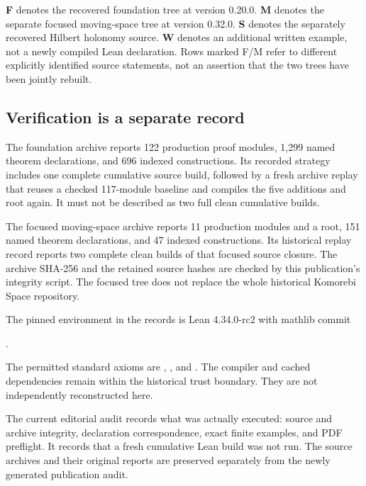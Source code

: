 \textbf{F} denotes the recovered foundation tree at version 0.20.0. \textbf{M} denotes the separate focused moving-space tree at version 0.32.0. \textbf{S} denotes the separately recovered Hilbert holonomy source. \textbf{W} denotes an additional written example, not a newly compiled Lean declaration. Rows marked F/M refer to different explicitly identified source statements, not an assertion that the two trees have been jointly rebuilt.



\par\noindent\begin{minipage}{\linewidth}\subsection{Verification is a separate record}
The foundation archive reports 122 production proof modules, 1,299 named theorem declarations, and 696 indexed constructions. Its recorded strategy includes one complete cumulative source build, followed by a fresh archive replay that reuses a checked 117-module baseline and compiles the five additions and root again. It must not be described as two full clean cumulative builds.

The focused moving-space archive reports 11 production modules and a root, 151 named theorem declarations, and 47 indexed constructions. Its historical replay record reports two complete clean builds of that focused source closure. The archive SHA-256 and the retained source hashes are checked by this publication's integrity script. The focused tree does not replace the whole historical Komorebi Space repository.

The pinned environment in the records is Lean 4.34.0-rc2 with mathlib commit\par\smallskip\noindent{}.\par\smallskip The permitted standard axioms are , , and . The compiler and cached dependencies remain within the historical trust boundary. They are not independently reconstructed here.

The current editorial audit records what was actually executed: source and archive integrity, declaration correspondence, exact finite examples, and PDF preflight. It records that a fresh cumulative Lean build was not run. The source archives and their original reports are preserved separately from the newly generated publication audit.

\end{minipage}
